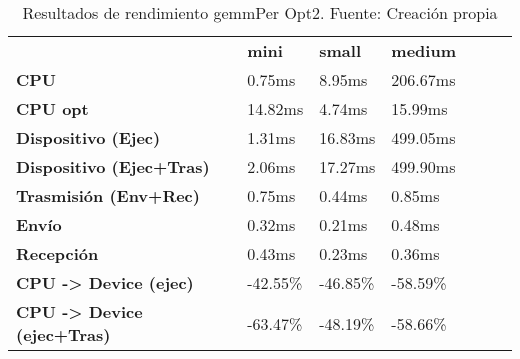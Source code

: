 \begin{table}[H]
    \centering
    \begin{tabular}{lllllll}
    \rowcolor[HTML]{DAE8FC} \ &  \textbf{mini} &  \textbf{	small} &  \textbf{	medium} \\
    \cellcolor[HTML]{DAE8FC} \textbf{CPU} & 0.75ms & 	8.95ms & 	206.67ms \\
    \rowcolor[HTML]{EFEFEF} \cellcolor[HTML]{DAE8FC} \textbf{CPU opt} & 14.82ms & 	4.74ms & 	15.99ms \\
    \cellcolor[HTML]{DAE8FC} \textbf{Dispositivo (Ejec)} & 1.31ms & 	16.83ms & 	499.05ms \\
    \rowcolor[HTML]{EFEFEF} \cellcolor[HTML]{DAE8FC} \textbf{Dispositivo (Ejec+Tras)} & 2.06ms & 	17.27ms & 	499.90ms \\
    \cellcolor[HTML]{DAE8FC} \textbf{Trasmisión (Env+Rec)} & 0.75ms & 	0.44ms & 	0.85ms \\
    \rowcolor[HTML]{EFEFEF} \cellcolor[HTML]{DAE8FC} \textbf{Envío} & 0.32ms & 	0.21ms & 	0.48ms \\
    \cellcolor[HTML]{DAE8FC} \textbf{Recepción} & 0.43ms & 	0.23ms & 	0.36ms \\
    \rowcolor[HTML]{EFEFEF} \cellcolor[HTML]{DAE8FC} \textbf{CPU -> Device (ejec)} & -42.55\% & 	-46.85\% & 	-58.59\% \\
    \cellcolor[HTML]{DAE8FC} \textbf{CPU -> Device (ejec+Tras)} & -63.47\% & 	-48.19\% & 	-58.66\% \\
    \end{tabular}
    \caption[Resultados de rendimiento gemmPer Opt2]{{Resultados de rendimiento gemmPer Opt2. Fuente: Creación propia}}
    \label{table_test_gemmPer_Opt2_hw_performanceResults}
\end{table}